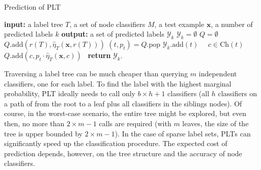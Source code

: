 \documentclass{article}
\newcommand{\Algo}[1]{\textsc{#1}}
\renewcommand{\vec}[1]{\boldsymbol{#1}}
\newcommand{\bx}{\vec{x}}
\newcommand{\by}{\vec{y}}
\newcommand{\calY}{\mathcal{Y}}
\newcommand{\heta}{\hat{\eta}}
\newcommand{\Children}[1]{\mathrm{Ch}(#1)}
\begin{document}

\begin{algorithm}[t]
\caption{Prediction of \Algo{PLT}} %
\label{alg:pt-prediction}
\begin{algorithmic}[1]
\State \textbf{input:} a label tree $T$,  a set of node classifiers $M$, a test example $\bx$, a number of predicted labels $k$ 
\State \textbf{output:} a set of predicted labels $\calY_k$ 
\State $\calY_k = \emptyset$
\State $Q = \emptyset$ 
\State $Q.\mathrm{add}(r(T),\heta_T(\bx,r(T)))$ 
\While{$|\calY_k| < k$}
\State $(t,p_t) = Q.\mathrm{pop}$
 $\calY_k.\mathrm{add}(t)$ 
\Else \ \algorithmicfor\ $c \in \Children{t}$\ \algorithmicdo\ $Q.\mathrm{add}(c, p_t \cdot \heta_T(\bx,c))$\ 
\EndIf
\EndWhile
\State \textbf{return} $\calY_k$. 
\end{algorithmic}
\end{algorithm} 

Traversing a label tree can be much cheaper than querying $m$ independent classifiers, one for each label. To find the label with the highest marginal probability, \Algo{PLT} ideally needs to call only $b\times h+1$ classifiers (all $h$ classifiers on a path of from the root to a leaf plus all classifiers in the siblings nodes). Of course, in the worst-case scenario, the entire tree might be explored, but even then, no more than $2 \times m-1$ calls are required (with $m$ leaves, the size of the tree is upper bounded by $2 \times m-1$). In the case of sparse label sets, \Algo{PLT}s can significantly speed up the classification procedure. The expected cost of prediction depends, however, on the tree structure and the accuracy of node classifiers.
\end{document}
